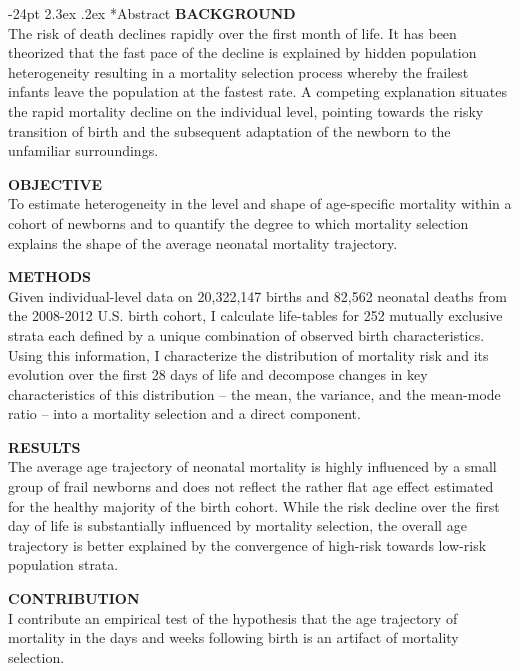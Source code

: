 \documentclass[10pt,twoside,reqno]{article}
\makeatletter
\renewcommand\section{\@startsection {section}{1}{\z@}%
                                   {-24pt}%
                                   {2.3ex \@plus.2ex}%
                                   {\normalfont\large\bfseries}}
\makeatother
\begin{document}
\section*{Abstract}
  \noindent\textbf{BACKGROUND}\\
  The risk of death declines rapidly over the first month of life. It has been theorized that the fast pace of the decline is explained by hidden population heterogeneity resulting in a mortality selection process whereby the frailest infants leave the population at the fastest rate. A competing explanation situates the rapid mortality decline on the individual level, pointing towards the risky transition of birth and the subsequent adaptation of the newborn to the unfamiliar surroundings.
  \par
  \noindent\textbf{OBJECTIVE}\\
  To estimate heterogeneity in the level and shape of age-specific mortality within a cohort of newborns and to quantify the degree to which mortality selection explains the shape of the average neonatal mortality trajectory.
  \par
  \noindent\textbf{METHODS}\\
  Given individual-level data on 20,322,147 births and 82,562 neonatal deaths from the 2008-2012 U.S. birth cohort, I calculate life-tables for 252 mutually exclusive strata each defined by a unique combination of observed birth characteristics. Using this information, I characterize the distribution of mortality risk and its evolution over the first 28 days of life and decompose changes in key characteristics of this distribution -- the mean, the variance, and the mean-mode ratio -- into a mortality selection and a direct component.
  \par
  \noindent\textbf{RESULTS}\\
  The average age trajectory of neonatal mortality is highly influenced by a small group of frail newborns and does not reflect the rather flat age effect estimated for the healthy majority of the birth cohort. While the risk decline over the first day of life is substantially influenced by mortality selection, the overall age trajectory is better explained by the convergence of high-risk towards low-risk population strata.
  \par
  \noindent\textbf{CONTRIBUTION}\\
  I contribute an empirical test of the hypothesis that the age trajectory of mortality in the days and weeks following birth is an artifact of mortality selection.
\vspace*{12pt}
\end{document}
